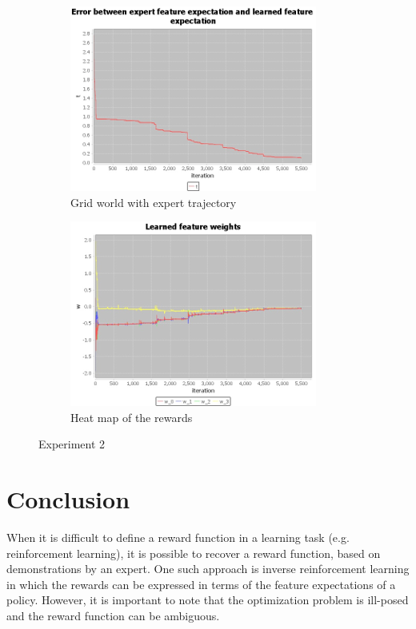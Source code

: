 \documentclass[10pt,a4paper,twocolumn]{article}
\begin{document}
\begin{figure}
\begin{subfigure}[b]{0.5\textwidth}
	\includegraphics[width=\textwidth]{experiment_2_t}
	\caption{Grid world with expert trajectory}
	\label{fig:experiment2t}
\end{subfigure}
\begin{subfigure}[b]{0.5\textwidth}
	\includegraphics[width=\textwidth]{experiment_2_w}
	\caption{Heat map of the rewards}
	\label{fig:experiment2w}
\end{subfigure}
\caption{Experiment 2}
\end{figure}



\section{Conclusion}
When it is difficult to define a reward function in a learning task (e.g. reinforcement learning), it is possible to recover a reward function, based on demonstrations by an expert. One such approach is inverse reinforcement learning in which the rewards can be expressed in terms of the feature expectations of a policy. However, it is important to note that the optimization problem is ill-posed and the reward function can be ambiguous.

 

\end{document}
